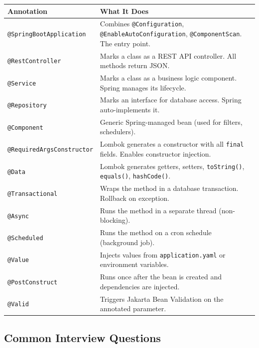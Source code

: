 \documentclass[11pt, a4paper]{article}
\begin{document}
\begin{longtable}{@{}lp{9cm}@{}}
\toprule
\textbf{Annotation} & \textbf{What It Does} \\
\midrule
\texttt{@SpringBootApplication} & Combines \texttt{@Configuration}, \texttt{@EnableAutoConfiguration}, \texttt{@ComponentScan}. The entry point. \\
\texttt{@RestController} & Marks a class as a REST API controller. All methods return JSON. \\
\texttt{@Service} & Marks a class as a business logic component. Spring manages its lifecycle. \\
\texttt{@Repository} & Marks an interface for database access. Spring auto-implements it. \\
\texttt{@Component} & Generic Spring-managed bean (used for filters, schedulers). \\
\texttt{@RequiredArgsConstructor} & Lombok generates a constructor with all \texttt{final} fields. Enables constructor injection. \\
\texttt{@Data} & Lombok generates getters, setters, \texttt{toString()}, \texttt{equals()}, \texttt{hashCode()}. \\
\texttt{@Transactional} & Wraps the method in a database transaction. Rollback on exception. \\
\texttt{@Async} & Runs the method in a separate thread (non-blocking). \\
\texttt{@Scheduled} & Runs the method on a cron schedule (background job). \\
\texttt{@Value} & Injects values from \texttt{application.yaml} or environment variables. \\
\texttt{@PostConstruct} & Runs once after the bean is created and dependencies are injected. \\
\texttt{@Valid} & Triggers Jakarta Bean Validation on the annotated parameter. \\
\bottomrule
\end{longtable}

\subsection{Common Interview Questions}
\end{document}
